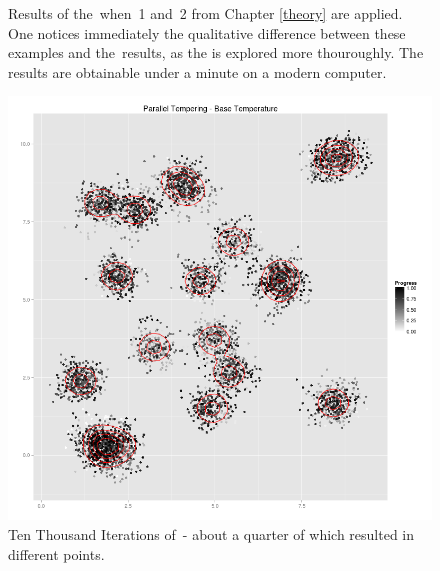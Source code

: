 \begin{figure}
\begin{minipage}[b]{.5\linewidth}
	\end{minipage}
	\caption[\PT\, with \strat\,1 and \strat\,2]{Results of the \PT\,when \strat\,1 and \strat\,2 from Chapter \ref{theory} are applied. One notices immediately the qualitative difference between these examples and the \MH\,results, as the \sspace is explored more thouroughly. The results are obtainable under a minute on a modern computer.}\label{PTshort}
\end{figure}

\begin{figure}[ht]
	\centering 
	\includegraphics[width=\textwidth,keepaspectratio]{./img/PT_simululation_base_temperature_10000_steps_1.png}
	\caption[Ten Thousand Iterations of \PT]{Ten Thousand Iterations of \PT\,- about a quarter of which resulted in different points.}\label{PTlong}
\end{figure}